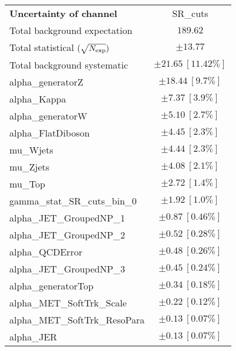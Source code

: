 
\begin{table}
\begin{center}
\setlength{\tabcolsep}{0.0pc}
\begin{tabular*}{\textwidth}{@{\extracolsep{\fill}}lc}
\noalign{\smallskip}\hline\noalign{\smallskip}
{\bf Uncertainty of channel}                                    & SR\_cuts            \\
\noalign{\smallskip}\hline\noalign{\smallskip}
Total background expectation             &  $189.62$       \\
\noalign{\smallskip}\hline\noalign{\smallskip}
Total statistical $(\sqrt{N_{\rm exp}})$              & $\pm 13.77$       \\
Total background systematic               & $\pm 21.65\ [11.42\%] $             \\
\noalign{\smallskip}\hline\noalign{\smallskip}
\noalign{\smallskip}\hline\noalign{\smallskip}
alpha\_generatorZ         & $\pm 18.44\ [9.7\%] $       \\
alpha\_Kappa         & $\pm 7.37\ [3.9\%] $       \\
alpha\_generatorW         & $\pm 5.10\ [2.7\%] $       \\
alpha\_FlatDiboson         & $\pm 4.45\ [2.3\%] $       \\
mu\_Wjets         & $\pm 4.44\ [2.3\%] $       \\
mu\_Zjets         & $\pm 4.08\ [2.1\%] $       \\
mu\_Top         & $\pm 2.72\ [1.4\%] $       \\
gamma\_stat\_SR\_cuts\_bin\_0         & $\pm 1.92\ [1.0\%] $       \\
alpha\_JET\_GroupedNP\_1         & $\pm 0.87\ [0.46\%] $       \\
alpha\_JET\_GroupedNP\_2         & $\pm 0.52\ [0.28\%] $       \\
alpha\_QCDError         & $\pm 0.48\ [0.26\%] $       \\
alpha\_JET\_GroupedNP\_3         & $\pm 0.45\ [0.24\%] $       \\
alpha\_generatorTop         & $\pm 0.34\ [0.18\%] $       \\
alpha\_MET\_SoftTrk\_Scale         & $\pm 0.22\ [0.12\%] $       \\
alpha\_MET\_SoftTrk\_ResoPara         & $\pm 0.13\ [0.07\%] $       \\
alpha\_JER         & $\pm 0.13\ [0.07\%] $       \\

\end{tabular*}
\end{center}
\end{table}
